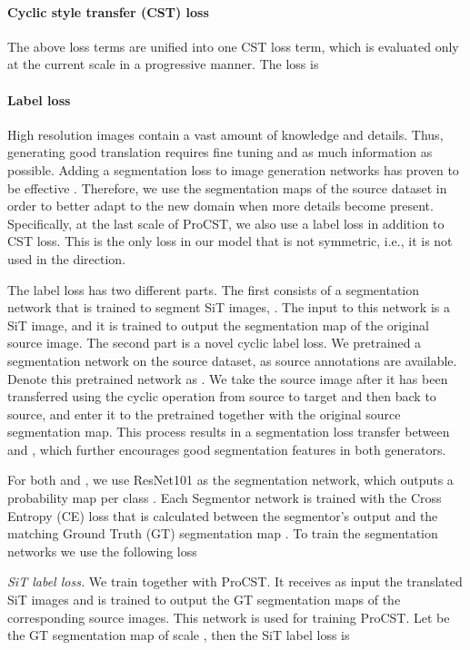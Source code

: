\documentclass[letterpaper]{article} \usepackage[]{aaai23}  \usepackage{times}  \usepackage{helvet}  \usepackage{courier}  \usepackage[hyphens]{url}  \usepackage{graphicx} \urlstyle{rm} \def\UrlFont{\rm}  \usepackage{natbib}  \usepackage{caption} \frenchspacing  \setlength{\pdfpagewidth}{8.5in} \setlength{\pdfpageheight}{11in} \usepackage{algorithm}
\begin{document}
\paragraph{Cyclic style transfer (CST) loss}
The above loss terms are unified into one CST loss term, which is evaluated only at the current scale  in a progressive manner. The loss is



\paragraph{Label loss}
High resolution images contain a vast amount of knowledge and details. Thus, generating good translation requires fine tuning and as much information as possible. Adding a segmentation loss to image generation networks has proven to be effective \cite{richter2021enhancing}.
Therefore, we use the segmentation maps of the source dataset in order to better adapt to the new domain when more details become present. Specifically, at the last scale of ProCST, we also use a label loss in addition to CST loss. This is the only loss in our model that is not symmetric, i.e., it is not used in the  direction. 

The label loss has two different parts. The first consists of a segmentation network that is trained to segment SiT images, . The input to this network is a SiT image, and it is trained to output the segmentation map of the original source image. The second part is a novel cyclic label loss. We pretrained a segmentation network on the source dataset, as source annotations are available. Denote this pretrained network as . We take the source image after it has been transferred using the cyclic operation from source to target and then back to source, and enter it to the pretrained  together with the original source segmentation map. This process results in a segmentation loss transfer between  and , which further encourages good segmentation features in both generators.  


For both  and , we use ResNet101 \cite{he2016deep} as the segmentation network, which outputs a probability map  per class .
Each Segmentor network is trained with the Cross Entropy (CE) loss that is calculated between the segmentor's output  and the matching Ground Truth (GT) segmentation map . To train the segmentation networks we use the following loss


\textit{SiT label loss.} We train  together with ProCST. It receives as input the translated SiT images and is trained to output the GT segmentation maps of the corresponding source images. This network is used for training ProCST. Let  be the GT segmentation map of scale , then the SiT label loss is
\end{document}
